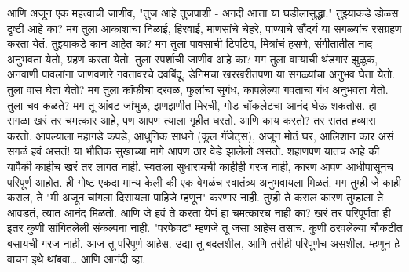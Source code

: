 आणि अजून एक महत्वाची जाणीव,  "तुज आहे तुजपाशी - अगदी आत्ता या घडीलासुद्धा."
तुझ्याकडे डोळस दृष्टी आहे का? मग तुला आकाशाचा निळाई, हिरवाई, माणसांचे चेहरे, पाण्याचे सौंदर्य या सगळ्यांचं रसग्रहण करता येतं. तुझ्याकडे कान आहेत का? मग तुला पावसाची टिपटिप, मित्रांचं हसणे, संगीतातील नाद अनुभवता येतो, ग्रहण करता येतो. तुला स्पर्शाची जाणीव आहे का? मग तुला वाऱ्याची थंडगार झुळूक, अनवाणी पावलांना जाणवणारे गवतावरचे दवबिंदू, डेनिमचा खरखरीतपणा या सगळ्यांचा अनुभव घेता येतो. तुला वास घेता येतो? मग तुला कॉफीचा दरवळ, फुलांचा सुगंध, कापलेल्या गवताचा गंध अनुभवता येतो. तुला चव कळते? मग तू आंबट जांभुळ, झणझणीत मिरची, गोड चॉकलेटचा आनंद घेऊ शकतोस.
हा सगळा खरं तर चमत्कार आहे, पण आपण त्याला गृहीत धरतो. आणि काय करतो? तर सतत हव्यास करतो.   आपल्याला महागडे कपडे, आधुनिक साधने (कूल गॅजेट्स), अजून मोठं घर, आलिशान कार असं सगळं हवं असतं! या भौतिक सुखाच्या मागे आपण ठार वेडे झालेलो असतो.
शहाणपण यातच आहे की यापैकी काहीच खरं तर लागत नाही. स्वतःला सुधारायची काहीही गरज नाही, कारण आपण आधीपासूनच परिपूर्ण आहोत.
ही गोष्ट एकदा मान्य केली की एक वेगळंच स्वातंत्र्य अनुभवायला मिळतं.
मग तुम्ही जे काही कराल, ते "मी अजून चांगला दिसायला पाहिजे म्हणून" करणार नाही. तुम्ही ते कराल कारण तुम्हाला ते आवडतं, त्यात आनंद मिळतो. आणि जे हवं ते करता येणं हा चमत्कारच नाही का?
खरं तर परिपूर्णता ही इतर कुणी सांगितलेली संकल्पना नाही. "परफेक्ट" म्हणजे तू जसा आहेस तसाच. कुणी ठरवलेल्या चौकटीत बसायची गरज नाही.
आज तू परिपूर्ण आहेस. उद्या तू बदलशील, आणि तरीही परिपूर्णच असशील.
म्हणून हे वाचन इथे थांबवा… आणि आनंदी व्हा.


